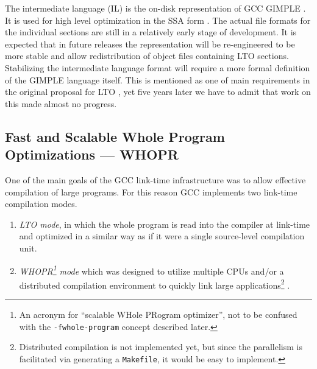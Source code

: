 \documentclass[final]{ols}
\begin{document}
The intermediate language (IL) is the on-disk representation of GCC GIMPLE \cite
{GIMPLE}. It is used for high level optimization in the SSA form \cite{SSA}. The
actual file formats for the individual sections are still in a relatively early stage
of development.  It is expected that in future releases the representation will be
re-engineered to be more stable and allow redistribution of object files containing LTO
sections. Stabilizing the intermediate language format will require
a more formal definition of the GIMPLE language itself.  This is mentioned as one of
main requirements in the original proposal for LTO \cite{LTOproposal}, yet
five years later we have to admit that work on this made almost no progress.

\subsection{Fast and Scalable Whole Program Optimizations --- WHOPR}

One of the main goals of the GCC link-time infrastructure was to allow
effective compilation of large programs.  For this reason GCC implements two
link-time compilation modes.
\begin{enumerate}
\item  {\em LTO mode}, in which the whole program is read into the compiler
at link-time and optimized in a similar way as if it were a single source-level compilation unit. 

\item {\em WHOPR\footnote{An acronym for ``scalable WHole PRogram optimizer'',
not to be confused with the {\tt -fwhole-program} concept described later.}
mode} which was designed to utilize multiple CPUs and/or a distributed
compilation environment to quickly link large applications\footnote{Distributed
compilation is not implemented yet, but since the parallelism is facilitated
via generating a {\tt Makefile}, it would be easy to implement.} \cite{WHOPR}.
\end{enumerate}
\end{document}

